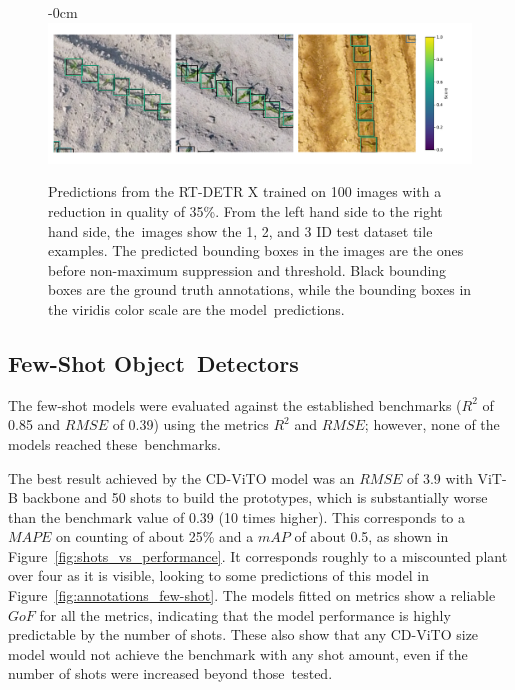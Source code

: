 \documentclass[12pt,a4paper,oneside]{report}
\newlength{\extralength}
\begin{document}
\begin{figure}[H]

  \begin{adjustwidth}{-\extralength}{0cm}
  \centering
  \includegraphics[width=17cm]{Plots/many_shot_quality_annotations.pdf}
  \end{adjustwidth}
  \vspace{-12pt}\caption{Predictions from the RT-DETR X trained on 100 images with a reduction 
  in quality of 35\%.
  From the left hand side to the right hand side, the~images show the
  1, 2, and 3 ID test dataset tile examples.
  The predicted bounding boxes in the images are the ones before 
  non-maximum suppression and threshold.
   Black bounding boxes are the ground truth annotations, while the bounding boxes 
   in the viridis color scale are the model~predictions.}
  \label{fig:annotations_many-shots_quality}

\end{figure}
\vspace{-9pt}

\subsection{Few-Shot Object~Detectors}

The few-shot models were evaluated against the established benchmarks ($R^2$ of 0.85 and $RMSE$ of 0.39) 
using the metrics $R^2$ and $RMSE$; however, none of the models reached these~benchmarks.

The best result achieved by the CD-ViTO model was an $RMSE$ of 3.9 with ViT-B backbone and 
50 shots to build the prototypes, which is substantially worse than the benchmark value of 0.39 (10 times higher). 
This corresponds to a $MAPE$ on counting of about 25\% 
and a $mAP$ of about 0.5, as shown in Figure~\ref{fig:shots_vs_performance}.
It corresponds roughly to a miscounted plant over four as it is visible, looking to
some predictions of this model in Figure~\ref{fig:annotations_few-shot}.
The models fitted on metrics show a reliable $GoF$ for all
the metrics, indicating that the model performance is highly predictable by the number of shots.
These also show that any CD-ViTO size model would not achieve the
benchmark with any shot amount, even if the number of shots were increased beyond those~tested.
\end{document}
